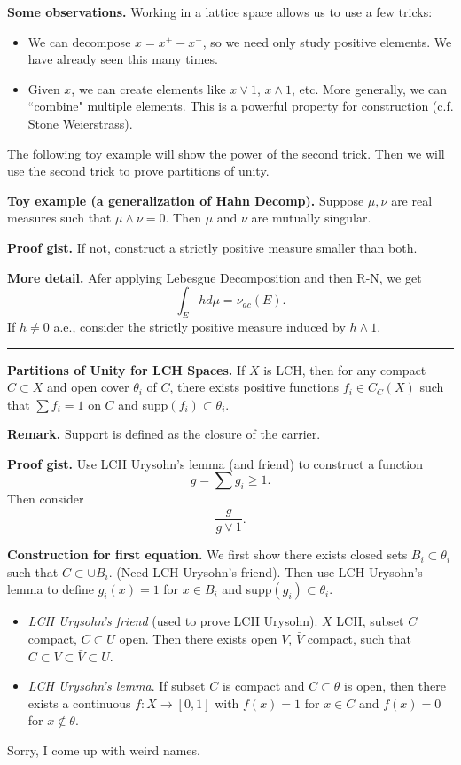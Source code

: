 \documentclass[12pt, letterpaper]{article}
\begin{document}
\pagestyle{fancy}

\textbf{Some observations.} Working in a lattice space allows us to use a few tricks:
\begin{itemize}
    \item We can decompose $x = x^+ - x^-$, so we need only study positive elements. We have already seen this many times.
    \item Given $x$, we can create elements like $x \vee 1$, $x \wedge 1$, etc. More generally, we can ``combine" multiple elements. This is a powerful property for construction (c.f. Stone Weierstrass).
\end{itemize}
The following toy example will show the power of the second trick. Then we will use the second trick to prove partitions of unity.

\textbf{Toy example (a generalization of Hahn Decomp).} Suppose $\mu, \nu$ are real measures such that $\mu \wedge \nu = 0$. Then $\mu$ and $\nu$ are mutually singular.

\textbf{Proof gist.} If not, construct a strictly positive measure smaller than both.

\textbf{More detail.} Afer applying Lebesgue Decomposition and then R-N, we get
\[
    \int_E h d\mu = \nu_{ac}(E).
\]
If $h \neq 0$ a.e., consider the strictly positive measure induced by $h \wedge 1$.

\noindent\rule{\textwidth}{1pt}

\textbf{Partitions of Unity for LCH Spaces.} If $X$ is LCH, then for any compact $C \subset X$ and open cover $\theta_i$ of $C$, there exists positive functions $f_i \in C_C(X)$ such that $\sum f_i = 1$ on $C$ and supp$(f_i) \subset \theta_i$.

\textbf{Remark.} Support is defined as the closure of the carrier.

\textbf{Proof gist.} Use LCH Urysohn's lemma (and friend) to construct a function
\[
    g = \sum g_i \geq 1.
\]
Then consider
\[
    \frac{g}{g \vee 1}.
\]

\textbf{Construction for first equation.} We first show there exists closed sets $B_i \subset \theta_i$ such that $C \subset \cup B_i$. (Need LCH Urysohn's friend). Then use LCH Urysohn's lemma to define $g_i(x) = 1$ for $x \in B_i$ and supp$(g_i) \subset \theta_i$.
\begin{itemize}
    \item \textit{LCH Urysohn's friend} (used to prove LCH Urysohn). $X$ LCH, subset $C$ compact, $C \subset U$ open. Then there exists open $V$, $\bar{V}$ compact, such that $C \subset V \subset \bar{V} \subset U$.
    \item \textit{LCH Urysohn's lemma}. If subset $C$ is compact and $C \subset \theta$ is open, then there exists a continuous $f: X \rightarrow [0,1]$ with $f(x) = 1$ for $x \in C$ and $f(x) = 0$ for $x \not \in \theta$.
\end{itemize}
Sorry, I come up with weird names.
\end{document}
